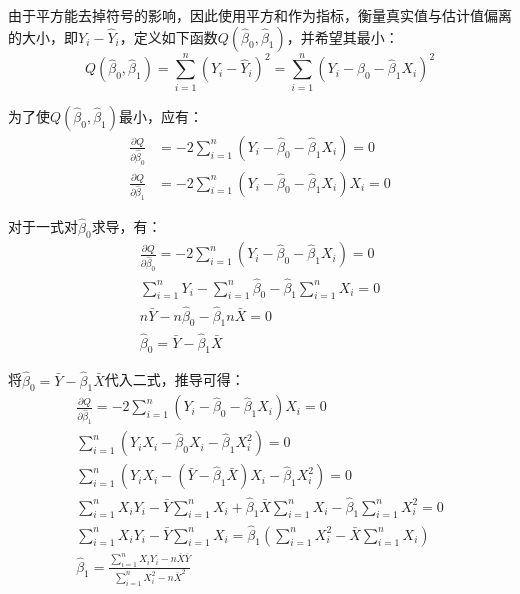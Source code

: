 \documentclass[11pt]{article}
\begin{document}
由于平方能去掉符号的影响，因此使用平方和作为指标，衡量真实值与估计值偏离的大小，即$Y_i - \hat{Y}_i$，定义如下函数$Q(\hat{\beta}_0, \hat{\beta}_1)$，并希望其最小：
\begin{equation*}
    Q(\hat{\beta}_0, \hat{\beta}_1)
    = \sum_{i=1}^{n} \left( Y_i - \hat{Y}_i \right)^2
    = \sum_{i=1}^{n} \left( Y_i - \hat{\beta}_0 - \hat{\beta}_1 X_i \right)^2
\end{equation*}

为了使$Q(\hat{\beta}_0,\hat{\beta}_1)$最小，应有：
\begin{align*}
    \frac{\partial Q}{\partial \hat{\beta}_0} &= -2 \sum_{i=1}^{n} \left( Y_i - \hat{\beta}_0 - \hat{\beta}_1 X_i \right) = 0 \\
    \frac{\partial Q}{\partial \hat{\beta}_1} &= -2 \sum_{i=1}^{n} \left( Y_i - \hat{\beta}_0 - \hat{\beta}_1 X_i \right) X_i = 0
\end{align*}

对于一式对$\hat{\beta}_0$求导，有：
\begin{gather*}
    \frac{\partial Q}{\partial \hat{\beta}_0} = -2 \sum_{i=1}^{n} \left( Y_i - \hat{\beta}_0 - \hat{\beta}_1 X_i \right) = 0 \\
    \sum_{i=1}^{n} Y_i - \sum_{i=1}^{n} \hat{\beta}_0 - \hat{\beta}_1 \sum_{i=1}^{n} X_i = 0 \\
    n \bar{Y} - n \hat{\beta}_0  - \hat{\beta}_1 n \bar{X} = 0 \\
    \hat{\beta}_0 = \bar{Y} - \hat{\beta}_1 \bar{X}
\end{gather*}

将$\hat{\beta}_0 = \bar{Y} - \hat{\beta}_1 \bar{X}$代入二式，推导可得：
\begin{gather*}
    \frac{\partial Q}{\partial \hat{\beta}_1} = -2 \sum_{i=1}^{n} \left( Y_i - \hat{\beta}_0 - \hat{\beta}_1 X_i \right) X_i = 0 \\
    \sum_{i=1}^{n} \left( Y_i X_i - \hat{\beta}_0 X_i - \hat{\beta}_1 X_i^2 \right) = 0 \\
    \sum_{i=1}^{n} \left( Y_i X_i - (\bar{Y} - \hat{\beta}_1 \bar{X}) X_i - \hat{\beta}_1 X_i^2 \right) = 0 \\
    \sum_{i=1}^{n} X_i Y_i - \bar{Y} \sum_{i=1}^{n} X_i + \hat{\beta}_1 \bar{X} \sum_{i=1}^{n} X_i - \hat{\beta}_1 \sum_{i=1}^{n} X_i^2 = 0 \\
    \sum_{i=1}^{n} X_i Y_i - \bar{Y} \sum_{i=1}^{n} X_i = \hat{\beta}_1 \left( \sum_{i=1}^{n} X_i^2 - \bar{X} \sum_{i=1}^{n} X_i \right) \\
    \hat{\beta}_1 = \frac{\sum_{i=1}^{n} X_i Y_i - n \bar{X} \bar{Y}}{\sum_{i=1}^{n} X_i^2 - n \bar{X}^2}
\end{gather*}
\end{document}
